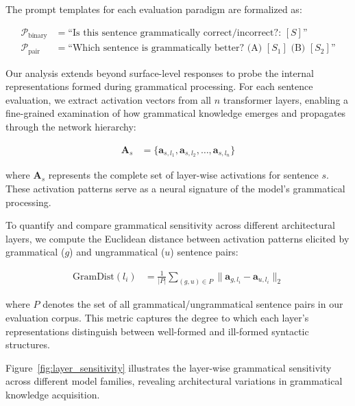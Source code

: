 \documentclass{article}
\begin{document}
The prompt templates for each evaluation paradigm are formalized as:

\begin{align}
  \mathcal{P}_{\text{binary}} &= \text{``Is this sentence grammatically correct/incorrect?: } [S]\text{''} \\
  \mathcal{P}_{\text{pair}} &= \text{``Which sentence is grammatically better? (A) } [S_1] \text{ (B) } [S_2]\text{''}
\end{align}

Our analysis extends beyond surface-level responses to probe the internal representations formed during grammatical processing. For each sentence evaluation, we extract activation vectors from all $n$ transformer layers, enabling a fine-grained examination of how grammatical knowledge emerges and propagates through the network hierarchy:

\begin{align}
  \mathbf{A}_s &= \{\mathbf{a}_{s,l_1}, \mathbf{a}_{s,l_2}, \ldots, \mathbf{a}_{s,l_n}\}
\end{align}

where $\mathbf{A}_s$ represents the complete set of layer-wise activations for sentence $s$. These activation patterns serve as a neural signature of the model's grammatical processing.

To quantify and compare grammatical sensitivity across different architectural layers, we compute the Euclidean distance between activation patterns elicited by grammatical ($g$) and ungrammatical ($u$) sentence pairs:

\begin{align}
  \text{GramDist}(l_i) &= \frac{1}{|P|}\sum_{(g,u) \in P} \|\mathbf{a}_{g,l_i} - \mathbf{a}_{u,l_i}\|_2
\end{align}

where $P$ denotes the set of all grammatical/ungrammatical sentence pairs in our evaluation corpus. This metric captures the degree to which each layer's representations distinguish between well-formed and ill-formed syntactic structures.

Figure~\ref{fig:layer_sensitivity} illustrates the layer-wise grammatical sensitivity across different model families, revealing architectural variations in grammatical knowledge acquisition.

\end{document}

